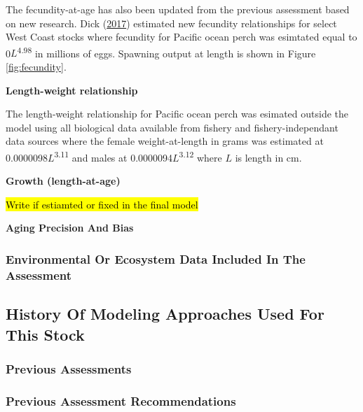 \documentclass[12pt,]{article}
\begin{document}
The fecundity-at-age has also been updated from the previous assessment
based on new research. Dick
(\protect\hyperlink{ref-dick_meta-analysis_2017}{2017}) estimated new
fecundity relationships for select West Coast stocks where fecundity for
Pacific ocean perch was esimtated equal to 0\(L\)\textsuperscript{4.98}
in millions of eggs. Spawning output at length is shown in Figure
\ref{fig:fecundity}.

\vspace{.5cm}

\textbf{Length-weight relationship}

The length-weight relationship for Pacific ocean perch was esimated
outside the model using all biological data available from fishery and
fishery-independant data sources where the female weight-at-length in
grams was estimated at 0.0000098\(L\)\textsuperscript{3.11} and males at
0.0000094\(L\)\textsuperscript{3.12} where \(L\) is length in cm.

\vspace{.5cm}

\textbf{Growth (length-at-age)}

\hl{Write if estiamted or fixed in the final model}

\vspace{.5cm} \textbf{Aging Precision And Bias}

\subsubsection{Environmental Or Ecosystem Data Included In The
Assessment}\label{environmental-or-ecosystem-data-included-in-the-assessment}

\subsection{History Of Modeling Approaches Used For This
Stock}\label{history-of-modeling-approaches-used-for-this-stock}

\subsubsection{Previous Assessments}\label{previous-assessments}

\subsubsection{Previous Assessment
Recommendations}\label{previous-assessment-recommendations}
\end{document}
